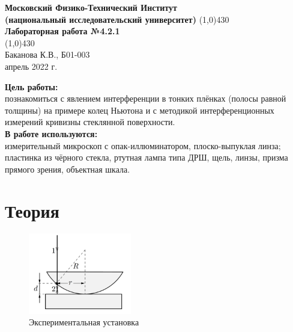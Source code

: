 \documentclass[a4paper, 12pt]{article}%
\begin{document}
\begin{titlepage}

\begin{center}
\large\textbf{Московский Физико-Технический Институт}\\
\large\textbf{(национальный исследовательский университет)}
\vfill
\line(1,0){430}\\[3mm]
\huge\textbf{Лабораторная работа №4.2.1}\\
\line(1,0){430}\\[1mm]
\vfill
\large Баканова К.В., Б01-003\\
\large апрель 2022 г.\\
\end{center}

\end{titlepage}
\noindent \textbf{Цель работы:} \\
\indent познакомиться с явлением интерференции в тонких плёнках (полосы равной толщины) на примере колец Ньютона и с методикой интерференционных измерений кривизны стеклянной поверхности.\\
\noindent \textbf{В работе используются:} \\
\indent измерительный микроскоп с опак-иллюминатором, плоско-выпуклая линза; пластинка из чёрного стекла, ртутная лампа типа ДРШ, щель, линзы, призма прямого зрения, объектная шкала.
	
\item      	
\item      

\section{Теория}


\begin{figure}
\begin{center}
\includegraphics[width = 0.4\textwidth]{ring.png}
\vspace{-20pt}
\end{center}
\caption{Экспериментальная установка}
\end{figure}
\end{document}

